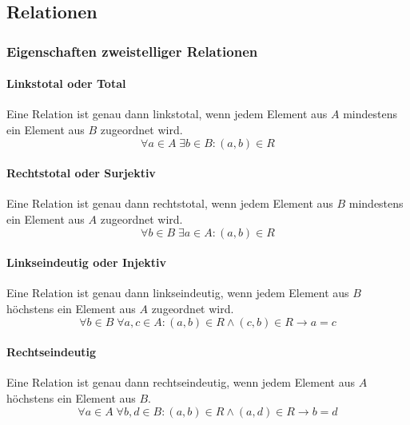 \documentclass[../main.tex]{subfiles}
\begin{document}
        \subsection{Relationen}
            \subsubsection{Eigenschaften zweistelliger Relationen}
                \paragraph{Linkstotal oder Total}
                    Eine Relation ist genau dann linkstotal, wenn jedem Element aus $A$ mindestens ein Element aus $B$ zugeordnet wird.
                    \begin{equation}
                        \forall a \in A\; \exists b \in B\colon \left(a, b\right) \in R
                    \end{equation}
                    
                \paragraph{Rechtstotal oder Surjektiv}
                    Eine Relation ist genau dann rechtstotal, wenn jedem Element aus $B$ mindestens ein Element aus $A$ zugeordnet wird.
                    \begin{equation}
                        \forall b \in B\; \exists a \in A\colon \left(a, b\right) \in R
                    \end{equation}
                    
                \paragraph{Linkseindeutig oder Injektiv}
                    Eine Relation ist genau dann linkseindeutig, wenn jedem Element aus $B$ höchstens ein Element aus $A$ zugeordnet wird.
                    \begin{equation}
                        \forall b \in B\; \forall a, c \in A\colon \left(a, b\right) \in R \wedge \left(c, b\right) \in R \rightarrow a = c
                    \end{equation}
                    
                \paragraph{Rechtseindeutig}
                    Eine Relation ist genau dann rechtseindeutig, wenn jedem Element aus $A$ höchstens ein Element aus $B$.
                    \begin{equation}
                        \forall a \in A\; \forall b, d \in B\colon \left(a, b\right) \in R \wedge \left(a, d\right) \in R \rightarrow b = d
                    \end{equation}
                    
\end{document}

